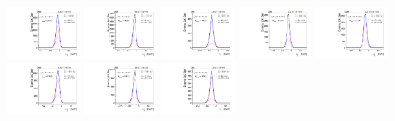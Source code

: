 \begin{figure}[htb]
\includegraphics[width=0.19\textwidth]{plots/Appendix_Recoil_Fits/WmmMC_PF_13TeV_2G/pfu1fit_8.pdf}
\includegraphics[width=0.19\textwidth]{plots/Appendix_Recoil_Fits/WmmMC_PF_13TeV_2G/pfu1fit_9.pdf}
\includegraphics[width=0.19\textwidth]{plots/Appendix_Recoil_Fits/WmmMC_PF_13TeV_2G/pfu1fit_19.pdf}
\includegraphics[width=0.19\textwidth]{plots/Appendix_Recoil_Fits/WmmMC_PF_13TeV_2G/pfu1fit_11.pdf}
\includegraphics[width=0.19\textwidth]{plots/Appendix_Recoil_Fits/WmmMC_PF_13TeV_2G/pfu1fit_12.pdf}
\includegraphics[width=0.19\textwidth]{plots/Appendix_Recoil_Fits/WmmMC_PF_13TeV_2G/pfu1fit_13.pdf}
\includegraphics[width=0.19\textwidth]{plots/Appendix_Recoil_Fits/WmmMC_PF_13TeV_2G/pfu1fit_14.pdf}
\includegraphics[width=0.19\textwidth]{plots/Appendix_Recoil_Fits/WmmMC_PF_13TeV_2G/pfu1fit_15.pdf}

\end{figure}

